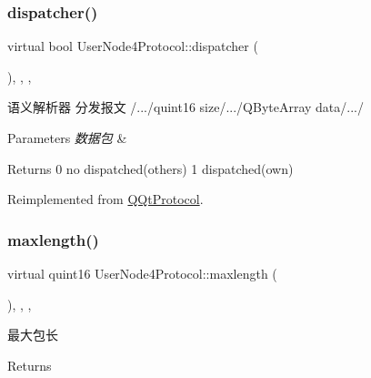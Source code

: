 \subsubsection{\texorpdfstring{dispatcher()}{dispatcher()}}
{\footnotesize\ttfamily virtual bool User\+Node4\+Protocol\+::dispatcher (\begin{DoxyParamCaption}\item[{const Q\+Byte\+Array \&}]{ }\end{DoxyParamCaption})\hspace{0.3cm}{\ttfamily [inline]}, {\ttfamily [override]}, {\ttfamily [protected]}, {\ttfamily [virtual]}}



语义解析器 分发报文 /.../quint16 size/.../\+Q\+Byte\+Array data/.../ 


\begin{DoxyParams}{Parameters}
{\em 数据包} & \\
\hline
\end{DoxyParams}
\begin{DoxyReturn}{Returns}
0 no dispatched(others) 1 dispatched(own) 
\end{DoxyReturn}


Reimplemented from \mbox{\hyperlink{class_q_qt_protocol_a35a69c4b89c8cf7459038f40d75e0dc9}{Q\+Qt\+Protocol}}.

\mbox{\label{class_user_node4_protocol_aec1bcb2d4f141b0e253f067fd968713f}} 
\subsubsection{\texorpdfstring{maxlength()}{maxlength()}}
{\footnotesize\ttfamily virtual quint16 User\+Node4\+Protocol\+::maxlength (\begin{DoxyParamCaption}{ }\end{DoxyParamCaption})\hspace{0.3cm}{\ttfamily [inline]}, {\ttfamily [override]}, {\ttfamily [protected]}, {\ttfamily [virtual]}}



最大包长 

\begin{DoxyReturn}{Returns}

\end{DoxyReturn}


